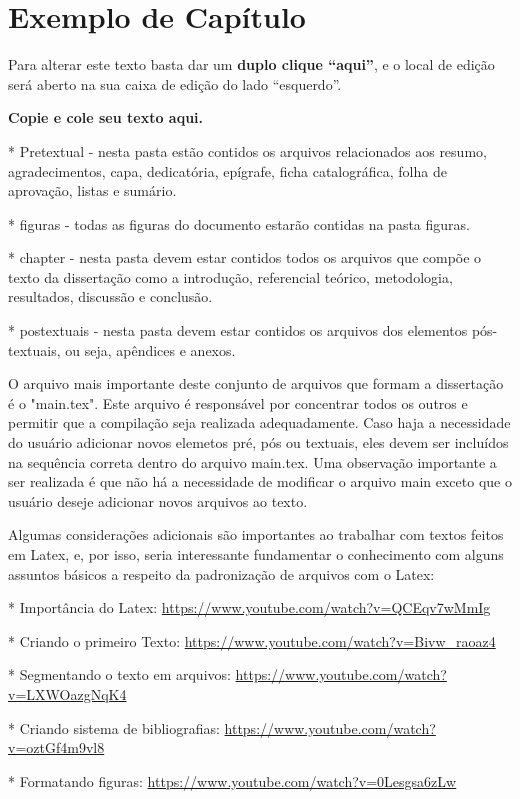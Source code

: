\chapter{Exemplo de Capítulo}
\label{cap:cap01}
Para alterar este texto basta dar um 
\textbf{duplo clique “aqui”}, e o local de edição será aberto na sua caixa de edição do lado “esquerdo”.

\textbf{Copie e cole seu texto aqui.}

* Pretextual - nesta pasta estão contidos os arquivos relacionados aos resumo, agradecimentos, capa, dedicatória, epígrafe, ficha catalográfica, folha de aprovação, listas e sumário.

* figuras - todas as figuras do documento estarão contidas na pasta figuras.

* chapter - nesta pasta devem estar contidos todos os arquivos que compõe o texto da dissertação como a introdução,  referencial teórico, metodologia, resultados, discussão e conclusão.

* postextuais - nesta pasta devem estar contidos os arquivos dos elementos pós-textuais, ou seja, apêndices e anexos.

 O arquivo mais importante deste conjunto de arquivos que formam a dissertação é o "main.tex". Este arquivo é responsável por concentrar todos os outros e permitir que a compilação seja realizada adequadamente. Caso haja a necessidade do usuário adicionar novos elemetos pré, pós ou textuais, eles devem ser incluídos na sequência correta dentro do arquivo main.tex. Uma observação importante a ser realizada é que não há a necessidade de modificar o arquivo main exceto que o usuário deseje adicionar novos arquivos ao texto.

 Algumas considerações adicionais são importantes ao trabalhar com textos feitos em Latex, e, por isso, seria interessante fundamentar o conhecimento com alguns assuntos básicos a respeito da padronização de arquivos com o Latex:
 
 * Importância do Latex: \url{https://www.youtube.com/watch?v=QCEqv7wMmIg}

* Criando o primeiro Texto: \url{https://www.youtube.com/watch?v=Bivw_raoaz4}

* Segmentando o texto em arquivos: \url{https://www.youtube.com/watch?v=LXWOazgNqK4}

* Criando sistema de bibliografias: \url{https://www.youtube.com/watch?v=oztGf4m9vl8}

* Formatando figuras: \url{https://www.youtube.com/watch?v=0Lesgsa6zLw}

